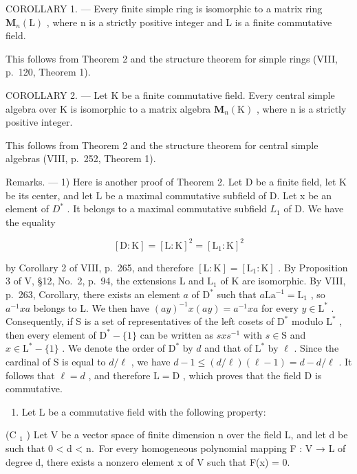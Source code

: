 COROLLARY 1. --- Every finite simple ring is isomorphic to a matrix ring \(\mathbf{M}_{n}(\mathrm{L})\) , where n is a strictly positive integer and L is a finite commutative field.

This follows from Theorem 2 and the structure theorem for simple rings (VIII, p.~120, Theorem 1).

COROLLARY 2. --- Let K be a finite commutative field. Every central simple algebra over K is isomorphic to a matrix algebra \(\mathbf{M}_{n}(\mathrm{K})\) , where n is a strictly positive integer.

This follows from Theorem 2 and the structure theorem for central simple algebras (VIII, p.~252, Theorem 1).

Remarks. --- 1) Here is another proof of Theorem 2. Let D be a finite field, let K be its center, and let L be a maximal commutative subfield of D. Let x be an element of \(D^{*}\) . It belongs to a maximal commutative subfield \(L_{1}\) of D. We have the equality

\[
[ \mathrm{D}: \mathrm{K} ] = [ \mathrm{L}: \mathrm{K} ] ^ {2} = [ \mathrm{L} _ {1}: \mathrm{K} ] ^ {2}
\]

by Corollary 2 of VIII, p.~265, and therefore \([\mathrm{L}:\mathrm{K}] = [\mathrm{L}_1:\mathrm{K}]\) . By Proposition 3 of V, §12, No.~2, p.~94, the extensions L and \(\mathrm{L}_1\) of K are isomorphic. By VIII, p.~263, Corollary, there exists an element \(a\) of \(\mathrm{D}^*\) such that \(a\mathrm{La}^{-1} = \mathrm{L}_1\) , so \(a^{-1}xa\) belongs to L. We then have \((ay)^{-1}x(ay) = a^{-1}xa\) for every \(y\in \mathrm{L}^*\) . Consequently, if S is a set of representatives of the left cosets of \(\mathrm{D}^*\) modulo \(\mathrm{L}^*\) , then every element of \(\mathrm{D}^* -\{1\}\) can be written as \(sxs^{-1}\) with \(s\in \mathrm{S}\) and \(x\in \mathrm{L}^* -\{1\}\) . We denote the order of \(\mathrm{D}^*\) by \(d\) and that of \(\mathrm{L}^*\) by \(\ell\) . Since the cardinal of S is equal to \(d / \ell\) , we have \(d - 1\leqslant (d / \ell)(\ell -1) = d - d / \ell\) . It follows that \(\ell = d\) , and therefore \(\mathrm{L} = \mathrm{D}\) , which proves that the field D is commutative.

\begin{enumerate}
\def\labelenumi{\arabic{enumi})}
\setcounter{enumi}{1}
\tightlist
\item
  Let L be a commutative field with the following property:
\end{enumerate}

(C \(_{1}\) ) Let V be a vector space of finite dimension n over the field L, and let d be such that 0 \textless{} d \textless{} n.~For every homogeneous polynomial mapping F : V → L of degree d, there exists a nonzero element x of V such that F(x) = 0.

